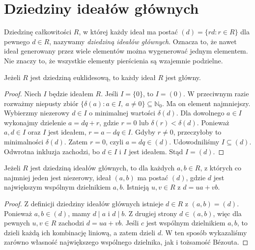 \section{Dziedziny ideałów głównych}
\begin{definicja}
\label{aa:def:pid}
Dziedzinę całkowitości $R$, w której każdy ideał ma postać
$(d)=\{rd:r\in R\}$ dla pewnego $d\in R$, nazywamy
\emph{dziedziną ideałów głównych}. Oznacza to, że nawet
ideał generowany przez wiele elementów można wygenerować
jednym elementem. Nie znaczy to, że wszystkie elementy
pierścienia są wzajemnie podzielne.
\end{definicja}
\begin{twierdzenie}
\label{aa:tw:euclidean-pid}
Jeżeli $R$ jest dziedziną euklidesową, to każdy ideał
$R$ jest główny.
\end{twierdzenie}
\begin{proof}
Niech $I$ będzie ideałem $R$. Jeśli $I=\{0\}$,
to $I=(0)$. W przeciwnym razie rozważmy niepusty zbiór
$\{\delta(a):a\in I,\ a\ne0\}\subseteq\mathbb N_0$.
Ma on element najmniejszy. Wybierzmy niezerowy $d\in I$
o minimalnej wartości $\delta(d)$. Dla dowolnego $a\in I$
wykonajmy dzielenie $a=dq+r$, gdzie $r=0$
lub $\delta(r)<\delta(d)$. Ponieważ $a,d\in I$
oraz $I$ jest ideałem, $r=a-dq\in I$.
Gdyby $r\ne0$, przeczyłoby to minimalności $\delta(d)$.
Zatem $r=0$, czyli $a=dq\in(d)$. Udowodniliśmy $I\subseteq(d)$.
Odwrotna inkluzja zachodzi, bo $d\in I$ i $I$ jest ideałem.
Stąd $I=(d)$.
\end{proof}

\begin{twierdzenie}
\label{aa:tw:pid-bezout}
Jeżeli $R$ jest dziedziną ideałów głównych, to dla
każdych $a,b\in R$, z których co najmniej jeden jest niezerowy,
ideał $(a,b)$ ma postać $(d)$, gdzie $d$ jest największym
wspólnym dzielnikiem $a,b$. Istnieją $u,v\in R$ z
$d=ua+vb$.
\end{twierdzenie}
\begin{proof}
Z definicji dziedziny ideałów głównych istnieje $d\in R$
z $(a,b)=(d)$. Ponieważ $a,b\in(d)$, mamy $d\mid a$
i $d\mid b$. Z drugiej strony $d\in(a,b)$, więc
dla pewnych $u,v\in R$ zachodzi $d=ua+vb$.
Jeśli $c$ jest wspólnym dzielnikiem $a,b$, to dzieli każdą
ich kombinację liniową, a zatem dzieli $d$.
W ten sposób wykazaliśmy zarówno własność największego
wspólnego dzielnika, jak i tożsamość Bézouta.
\end{proof}

